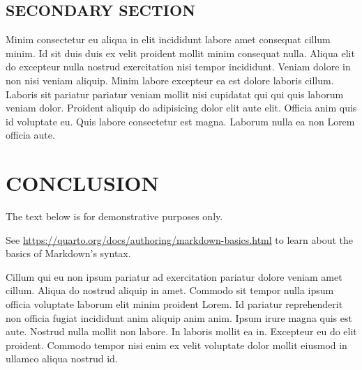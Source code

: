 \documentclass[
  12pt,
  a4paper,
  oneside]{tesesusp}
\begin{document}
\hypertarget{secondary-section-1}{%
\section{SECONDARY SECTION}\label{secondary-section-1}}

Minim consectetur eu aliqua in elit incididunt labore amet consequat
cillum minim. Id sit duis duis ex velit proident mollit minim consequat
nulla. Aliqua elit do excepteur nulla nostrud exercitation nisi tempor
incididunt. Veniam dolore in non nisi veniam aliquip. Minim labore
excepteur ea est dolore laboris cillum. Laboris sit pariatur pariatur
veniam mollit nisi cupidatat qui qui quis laborum veniam dolor. Proident
aliquip do adipisicing dolor elit aute elit. Officia anim quis id
voluptate eu. Quis labore consectetur est magna. Laborum nulla ea non
Lorem officia aute.


\hypertarget{conclusion}{%
\chapter{CONCLUSION}\label{conclusion}}

\begin{tcolorbox}[enhanced jigsaw, colback=white, breakable, title=\textcolor{quarto-callout-important-color}{\faExclamation}\hspace{0.5em}{Important}, colbacktitle=quarto-callout-important-color!10!white, coltitle=black, bottomrule=.15mm, left=2mm, opacitybacktitle=0.6, colframe=quarto-callout-important-color-frame, rightrule=.15mm, opacityback=0, toptitle=1mm, leftrule=.75mm, bottomtitle=1mm, titlerule=0mm, arc=.35mm, toprule=.15mm]

The text below is for demonstrative purposes only.

\vspace{5pt}

See \url{https://quarto.org/docs/authoring/markdown-basics.html} to
learn about the basics of Markdown's syntax.

\end{tcolorbox}

\vspace{10pt}

Cillum qui eu non ipsum pariatur ad exercitation pariatur dolore veniam
amet cillum. Aliqua do nostrud aliquip in amet. Commodo sit tempor nulla
ipsum officia voluptate laborum elit minim proident Lorem. Id pariatur
reprehenderit non officia fugiat incididunt anim aliquip anim anim.
Ipsum irure magna quis est aute. Nostrud nulla mollit non labore. In
laboris mollit ea in. Excepteur eu do elit proident. Commodo tempor nisi
enim ex velit voluptate dolor mollit eiusmod in ullamco aliqua nostrud
id.
\end{document}
